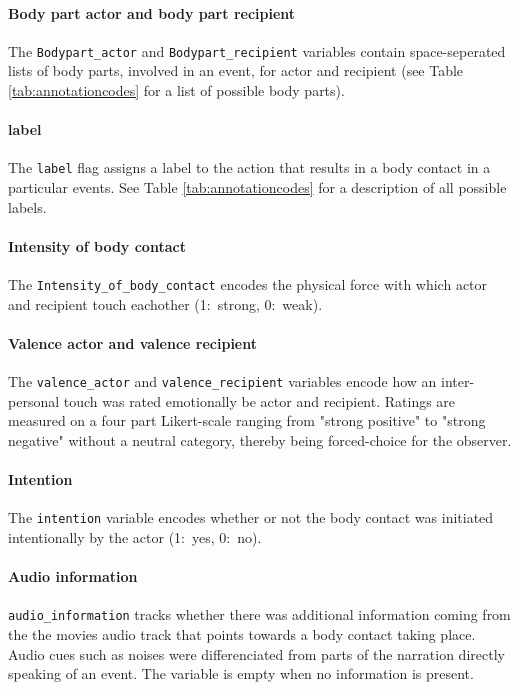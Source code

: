 \documentclass[10pt,a4paper,twocolumn]{article}
\begin{document}
\paragraph{Body part actor and body part recipient}
The \texttt{Bodypart_actor} and \texttt{Bodypart_recipient} variables contain space-seperated lists of body parts, involved in an event, for actor and recipient (see Table
\ref{tab:annotationcodes} for a list of possible body parts). 


\paragraph{label} The \texttt{label} flag assigns a label to the action that results in a body contact in a particular events. See Table
\ref{tab:annotationcodes} for a description of all possible labels.

\paragraph{Intensity of body contact} The \texttt{Intensity_of_body_contact} encodes the physical force with which actor and recipient touch eachother (1:~strong,
0:~weak).

\paragraph{Valence actor and valence recipient}
The \texttt{valence_actor} and \texttt{valence_recipient} variables encode how an inter-personal touch was rated emotionally be actor and recipient.
Ratings are measured on a four part Likert-scale ranging from "strong positive" to "strong negative" without a neutral category, thereby being forced-choice for the observer.

\paragraph{Intention} The \texttt{intention} variable encodes whether or not the body contact was initiated intentionally by the actor (1:~yes,
0:~no).

\paragraph{Audio information}
\texttt{audio_information} tracks whether there was additional information coming from the the movies audio track that points towards a body contact taking place. Audio cues such as noises were differenciated from parts of the narration directly speaking of an event. The variable is empty when no information is present. 
\end{document}
